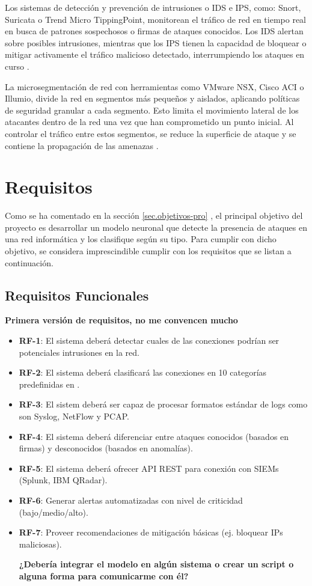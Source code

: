 Los sistemas de detección y prevención de intrusiones o IDS e IPS, como: Snort, Suricata o Trend Micro TippingPoint, monitorean el tráfico de red en tiempo real en busca de patrones sospechosos o firmas de ataques conocidos. Los IDS alertan sobre posibles intrusiones, mientras que los IPS tienen la capacidad de bloquear o mitigar activamente el tráfico malicioso detectado, interrumpiendo los ataques en curso \cite{geekflare_ids_ips}.

La microsegmentación de red con herramientas como VMware NSX, Cisco ACI o Illumio, divide la red en segmentos más pequeños y aislados, aplicando políticas de seguridad granular a cada segmento. Esto limita el movimiento lateral de los atacantes dentro de la red una vez que han comprometido un punto inicial. Al controlar el tráfico entre estos segmentos, se reduce la superficie de ataque y se contiene la propagación de las amenazas \cite{paloaltonetworks_microsegmentation}.

\section{Requisitos}  \label{sec.requisitos} 
Como se ha comentado en la sección \ref{sec.objetivos-pro} , el principal objetivo del proyecto es desarrollar un modelo neuronal que detecte la presencia de ataques en una red informática y los clasifique según su tipo. Para cumplir con dicho objetivo, se considera imprescindible cumplir con los requisitos que se listan a continuación.

\subsection{Requisitos Funcionales}   \label{sec.req-funcionales}
\textbf{Primera versión de requisitos, no me convencen mucho}
\begin{itemize}  
    \item \textbf{RF-1}: El sistema deberá detectar cuales de las conexiones podrían ser potenciales intrusiones en la red.
    \item \textbf{RF-2}: El sistema deberá clasificará las conexiones en 10 categorías predefinidas en .  
	\item \textbf{RF-3}: El sistem deberá ser capaz de procesar formatos estándar de logs como son Syslog, NetFlow y PCAP.
	\item \textbf{RF-4}: El sistema deberá diferenciar entre ataques conocidos (basados en firmas) y desconocidos (basados en anomalías).
	\item \textbf{RF-5}: El sistema deberá ofrecer API REST para conexión con SIEMs (Splunk, IBM QRadar).
	\item \textbf{RF-6}: Generar alertas automatizadas con nivel de criticidad (bajo/medio/alto).
	\item \textbf{RF-7}: Proveer recomendaciones de mitigación básicas (ej. bloquear IPs maliciosas).

	
	
\textbf{¿Debería integrar el modelo en algún sistema o crear un script o alguna forma para comunicarme con él?}
		
\end{itemize}  

